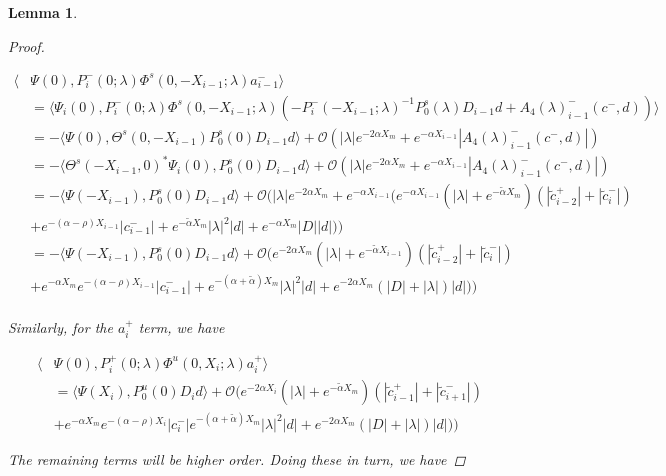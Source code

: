 \documentclass[12pt]{article}
\newtheorem{lemma}{Lemma}
\begin{document}
\begin{lemma}
\begin{proof}
\begin{enumerate}
\begin{align*}
\langle &\Psi(0), P_i^-(0; \lambda) \Phi^s(0, -X_{i-1}; \lambda) a_{i-1}^- \rangle \\
&= \langle \Psi_i(0), P_i^-(0; \lambda) \Phi^s(0, -X_{i-1}; \lambda) (- P_i^-(-X_{i-1}; \lambda)^{-1} P_0^s(\lambda) D_{i-1} d + A_4(\lambda)_{i-1}^-(c^-, d)) \rangle \\
&= -\langle \Psi(0), \Theta^s(0, -X_{i-1}) P_0^s(0) D_{i-1} d \rangle + \mathcal{O}( |\lambda|e^{-2 \alpha X_m} + e^{-\alpha X_{i-1}} |A_4(\lambda)_{i-1}^-(c^-, d)|)\\
&= -\langle \Theta^s(-X_{i-1}, 0)^* \Psi_i(0), P_0^s(0) D_{i-1} d \rangle + \mathcal{O}( |\lambda|e^{-2 \alpha X_m} + e^{-\alpha X_{i-1}} |A_4(\lambda)_{i-1}^-(c^-, d)|)\\
&= -\langle \Psi(-X_{i-1}), P_0^s(0) D_{i-1} d \rangle + \mathcal{O}\Big( |\lambda|e^{-2 \alpha X_m} + e^{-\alpha X_{i-1}} ( 
e^{-\alpha X_{i-1}}(|\lambda| + e^{-\tilde{\alpha}X_m})(|\tilde{c}_{i-2}^+| + |\tilde{c}_i^-|) \\
&+ e^{-(\alpha - \rho) X_{i-1}} |c_{i-1}^-| + e^{-\tilde{\alpha} X_m} |\lambda|^2|d| + e^{-\alpha X_m}|D||d|) \Big) \\
&= -\langle \Psi(-X_{i-1}), P_0^s(0) D_{i-1} d \rangle 
+ \mathcal{O}\Big(  
e^{-2 \alpha X_m}(|\lambda| + e^{-\tilde{\alpha}X_{i-1}})(|\tilde{c}_{i-2}^+| + |\tilde{c}_i^-|) \\
&+ e^{-\alpha X_m}e^{-(\alpha - \rho) X_{i-1}} |c_{i-1}^-| + e^{-(\alpha + \tilde{\alpha}) X_m} |\lambda|^2|d| + e^{-2 \alpha X_m}(|D| + |\lambda|)|d|) \Big) \\ 
\end{align*}

Similarly, for the $a_i^+$ term, we have

\begin{align*}
\langle &\Psi(0), P_i^+(0; \lambda) \Phi^u(0, X_i; \lambda) a_i^+ \rangle \\
&= \langle \Psi(X_i), P_0^u(0) D_i d \rangle + \mathcal{O}\Big( e^{-2 \alpha X_i} (|\lambda| + e^{-\tilde{\alpha}X_m})(|\tilde{c}_{i-1}^+| + |\tilde{c}_{i+1}^-|) \\
&+ e^{-\alpha X_m} e^{-(\alpha - \rho) X_i} |c_i^-| e^{-(\alpha + \tilde{\alpha}) X_m} |\lambda|^2|d| + e^{-2 \alpha X_m}(|D| + |\lambda|)|d|) \Big)
\end{align*}

\end{enumerate}

The remaining terms will be higher order. Doing these in turn, we have


\end{proof}
\end{lemma}
\end{document}
